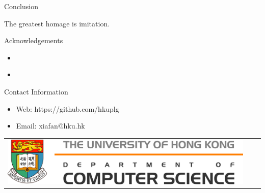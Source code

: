 \documentclass[final]{beamer}
\newlength{\onecolwid}
\begin{document}
\begin{frame}[t]
\begin{columns}[t]
\begin{column}{\onecolwid}
\begin{block}{Conclusion}

 The greatest homage is imitation.


\end{block}





\begin{block}{Acknowledgements}
\begin{itemize}
\item \small{}
\item \small{} \\
\end{itemize}
\end{block}



\begin{alertblock}{Contact Information}

\begin{itemize}
\item Web: https://github.com/hkuplg
\item Email: xiafan@hku.hk
\end{itemize}

\end{alertblock}

\begin{center}
\begin{tabular}{ccc}
\includegraphics[width=0.8\linewidth]{img/hkulogo} & \hfill &
\end{tabular}
\end{center}


\end{column}
\end{columns}
\end{frame}
\end{document}

